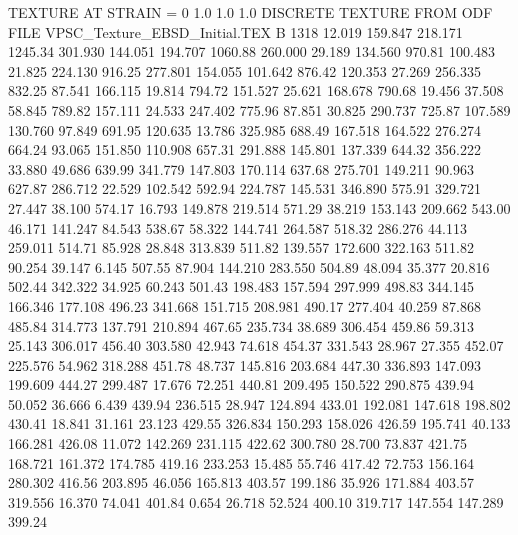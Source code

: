 TEXTURE AT STRAIN = 0
1.0   1.0   1.0
DISCRETE TEXTURE FROM ODF FILE VPSC_Texture\RD_EBSD_Initial.TEX
B 1318
  12.019  159.847  218.171      1245.34
 301.930  144.051  194.707      1060.88
 260.000   29.189  134.560       970.81
 100.483   21.825  224.130       916.25
 277.801  154.055  101.642       876.42
 120.353   27.269  256.335       832.25
  87.541  166.115   19.814       794.72
 151.527   25.621  168.678       790.68
  19.456   37.508   58.845       789.82
 157.111   24.533  247.402       775.96
  87.851   30.825  290.737       725.87
 107.589  130.760   97.849       691.95
 120.635   13.786  325.985       688.49
 167.518  164.522  276.274       664.24
  93.065  151.850  110.908       657.31
 291.888  145.801  137.339       644.32
 356.222   33.880   49.686       639.99
 341.779  147.803  170.114       637.68
 275.701  149.211   90.963       627.87
 286.712   22.529  102.542       592.94
 224.787  145.531  346.890       575.91
 329.721   27.447   38.100       574.17
  16.793  149.878  219.514       571.29
  38.219  153.143  209.662       543.00
  46.171  141.247   84.543       538.67
  58.322  144.741  264.587       518.32
 286.276   44.113  259.011       514.71
  85.928   28.848  313.839       511.82
 139.557  172.600  322.163       511.82
  90.254   39.147    6.145       507.55
  87.904  144.210  283.550       504.89
  48.094   35.377   20.816       502.44
 342.322   34.925   60.243       501.43
 198.483  157.594  297.999       498.83
 344.145  166.346  177.108       496.23
 341.668  151.715  208.981       490.17
 277.404   40.259   87.868       485.84
 314.773  137.791  210.894       467.65
 235.734   38.689  306.454       459.86
  59.313   25.143  306.017       456.40
 303.580   42.943   74.618       454.37
 331.543   28.967   27.355       452.07
 225.576   54.962  318.288       451.78
  48.737  145.816  203.684       447.30
 336.893  147.093  199.609       444.27
 299.487   17.676   72.251       440.81
 209.495  150.522  290.875       439.94
  50.052   36.666    6.439       439.94
 236.515   28.947  124.894       433.01
 192.081  147.618  198.802       430.41
  18.841   31.161   23.123       429.55
 326.834  150.293  158.026       426.59
 195.741   40.133  166.281       426.08
  11.072  142.269  231.115       422.62
 300.780   28.700   73.837       421.75
 168.721  161.372  174.785       419.16
 233.253   15.485   55.746       417.42
  72.753  156.164  280.302       416.56
 203.895   46.056  165.813       403.57
 199.186   35.926  171.884       403.57
 319.556   16.370   74.041       401.84
   0.654   26.718   52.524       400.10
 319.717  147.554  147.289       399.24
